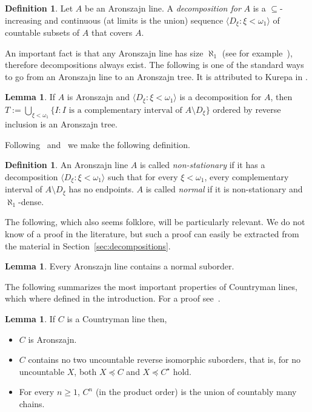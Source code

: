 \documentclass[10pt]{amsart}
\theoremstyle{definition}
\newtheorem{definition}[theorem]{Definition}
\newtheorem{lemma}[theorem]{Lemma}
\theoremstyle{remark}
\newcommand{\seb}{\subseteq}
\newcommand{\setm}{\setminus}
\newcommand{\tup}[1]{\langle#1\rangle}
\newcommand{\eleq}{\preceq}
\newcommand{\1}{\mathbbm{1}}
\begin{document}
\begin{definition}\label{df:decomposition}
  Let $A$ be an Aronszajn line. A \emph{decomposition for} $A$ is
  a $\seb$-increasing and continuous (at limits is the union) sequence
  $\tup{D_{\xi} : \xi < \omega_{1}}$ of countable subsets of $A$
  that covers $A$.
\end{definition}

An important fact is that any Aronszajn line has size $\aleph_{1}$
(see for example~\cite[Corollary~4.3]{Baumgartner1982}),
therefore decompositions always exist. The following is one of the
standard ways to go from an Aronszajn line to an Aronszajn tree.
It is attributed to Kurepa in \cite{Todorcevic1984}.

\begin{lemma}
  If $A$ is Aronszajn and $\tup{D_{\xi} : \xi < \omega_{1} }$ is a decomposition
  for $A$, then $T := \bigcup_{\xi < \omega_{1}}
  \{I : I \text{ is a complementary interval of $A \setm D_{\xi}$}\}$
  ordered by reverse inclusion is an Aronszajn tree.
\end{lemma}

Following~\cite{Moore2009} and~\cite{ShelahAbraham} we make the
following definition.

\begin{definition}\label{df:normal}
  An Aronszajn line $A$ is called
  \emph{non-stationary} if it has a decomposition $\tup{D_{\xi} : \xi <
    \omega_{1}}$ such that for every $\xi < \omega_{1}$, every
  complementary interval of $A \setm D_{\xi}$ has no endpoints.  $A$
  is called \emph{normal} if it is non-stationary and
  $\aleph_{1}$-dense.
\end{definition}

The following, which also seems folklore, will be particularly
relevant.  We do not know of a proof in the literature, but such a
proof can easily be extracted from the material in Section~\ref{sec:decompositions}.

\begin{lemma}\label{lem:normal-suborder}
  Every Aronszajn line contains a normal suborder.
\end{lemma}

The following summarizes the most important properties of Countryman lines,
which where defined in the introduction.
For a proof see~\cite[Theorem~5.4]{Todorcevic1984}.

\begin{lemma}\label{lem:cline-fund}
  If $C$ is a Countryman line then,
  \begin{itemize}\itemsep0em
    \item $C$ is Aronszajn.
    \item $C$ contains no two uncountable reverse isomorphic suborders, that
    is, for no uncountable $X$, both $X \eleq C$ and $X \eleq C^{\star}$ hold.
    \item For every $n \ge 1$, $C^{n}$ (in the product order)
    is the union of countably many chains.
  \end{itemize}
\end{lemma}
\end{document}
